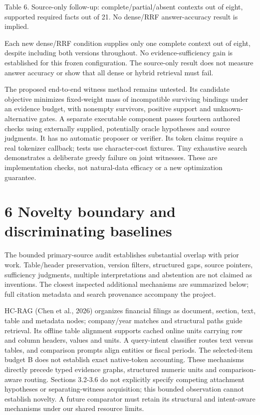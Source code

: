 \documentclass[11pt]{article}
\begin{document}
{\small Table 6. Source-only follow-up: complete/partial/absent contexts out of eight, supported required facts out of 21. No dense/RRF answer-accuracy result is implied.}

Each new dense/RRF condition supplies only one complete context out of eight, despite including both versions throughout. No evidence-sufficiency gain is established for this frozen configuration. The source-only result does not measure answer accuracy or show that all dense or hybrid retrieval must fail.


The proposed end-to-end witness method remains untested. Its candidate objective minimizes fixed-weight mass of incompatible surviving bindings under an evidence budget, with nonempty survivors, positive support and unknown-alternative gates. A separate executable component passes fourteen authored checks using externally supplied, potentially oracle hypotheses and source judgments. It has no automatic proposer or verifier. Its token claims require a real tokenizer callback; tests use character-cost fixtures. Tiny exhaustive search demonstrates a deliberate greedy failure on joint witnesses. These are implementation checks, not natural-data efficacy or a new optimization guarantee.


\section*{6  Novelty boundary and discriminating baselines}

The bounded primary-source audit establishes substantial overlap with prior work. Table/header preservation, version filters, structured gaps, source pointers, sufficiency judgments, multiple interpretations and abstention are not claimed as inventions. The closest inspected additional mechanisms are summarized below; full citation metadata and search provenance accompany the project.


HC-RAG (Chen et al., 2026) organizes financial filings as document, section, text, table and metadata nodes; company/year matches and structural paths guide retrieval. Its offline table alignment supports cached online units carrying row and column headers, values and units. A query-intent classifier routes text versus tables, and comparison prompts align entities or fiscal periods. The selected-item budget B does not establish exact native-token accounting. These mechanisms directly precede typed evidence graphs, structured numeric units and comparison-aware routing. Sections 3.2-3.6 do not explicitly specify competing attachment hypotheses or separating-witness acquisition; this bounded observation cannot establish novelty. A future comparator must retain its structural and intent-aware mechanisms under our shared resource limits.
\end{document}

